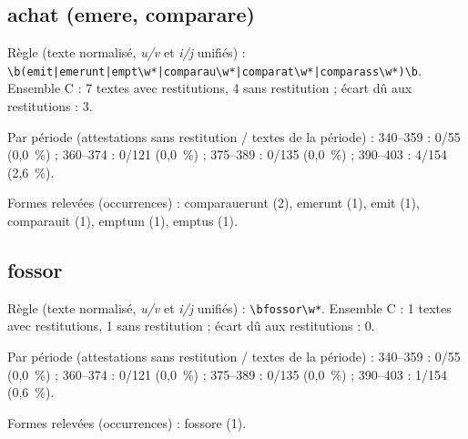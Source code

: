 \subsection*{achat (emere, comparare)}
\noindent Règle (texte normalisé, \textit{u/v} et \textit{i/j} unifiés) : \texttt{\small \textbackslash{}b(\allowbreak{}emit|\allowbreak{}emerunt|\allowbreak{}empt\textbackslash{}w*|\allowbreak{}comparau\textbackslash{}w*|\allowbreak{}comparat\textbackslash{}w*|\allowbreak{}comparass\textbackslash{}w*)\textbackslash{}b}. Ensemble C : 7 textes avec restitutions, 4 sans restitution ; écart dû aux restitutions : 3.\par
\noindent Par période (attestations sans restitution / textes de la période) : 340–359 : 0/55 (0,0~\%) ; 360–374 : 0/121 (0,0~\%) ; 375–389 : 0/135 (0,0~\%) ; 390–403 : 4/154 (2,6~\%).\par
\noindent Formes relevées (occurrences) : comparauerunt (2), emerunt (1), emit (1), comparauit (1), emptum (1), emptus (1).\par
{}\par\medskip
\subsection*{fossor}
\noindent Règle (texte normalisé, \textit{u/v} et \textit{i/j} unifiés) : \texttt{\small \textbackslash{}bfossor\textbackslash{}w*}. Ensemble C : 1 textes avec restitutions, 1 sans restitution ; écart dû aux restitutions : 0.\par
\noindent Par période (attestations sans restitution / textes de la période) : 340–359 : 0/55 (0,0~\%) ; 360–374 : 0/121 (0,0~\%) ; 375–389 : 0/135 (0,0~\%) ; 390–403 : 1/154 (0,6~\%).\par
\noindent Formes relevées (occurrences) : fossore (1).\par
{}\par\medskip
